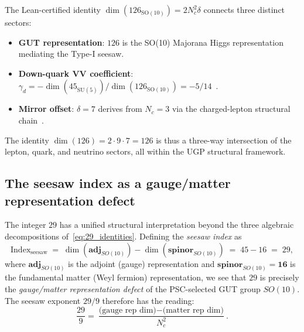 \documentclass[12pt,a4paper]{article}
\theoremstyle{definition}
\theoremstyle{remark}
\begin{document}
The Lean-certified identity $\dim(126_{\mathrm{SO}(10)}) = 2 N_c^2 \delta$
connects three distinct sectors:
\begin{itemize}[leftmargin=1.3em,itemsep=0.15em]
  \item \textbf{GUT representation}: $126$ is the SO(10)
    Majorana Higgs representation mediating the Type-I seesaw.
  \item \textbf{Down-quark VV coefficient}: $\gamma_d = -\dim(45_{\mathrm{SU}(5)})/\dim(126_{\mathrm{SO}(10)}) = -5/14$~\cite{Spivack2026_CyclotomicMass}.
  \item \textbf{Mirror offset}: $\delta = 7$ derives from $N_c = 3$
    via the charged-lepton structural chain~\cite{Spivack2026_Koide}.
\end{itemize}
The identity $\dim(126) = 2 \cdot 9 \cdot 7 = 126$
is thus a three-way intersection of the lepton, quark, and neutrino sectors,
all within the UGP structural framework.

\subsection{The seesaw index as a gauge/matter representation defect}
\label{subsec:seesaw_index}

The integer $29$ has a unified structural interpretation beyond the three algebraic decompositions of~\eqref{eq:29_identities}.  Defining the \emph{seesaw index} as
\[
  \mathrm{Index}_{\mathrm{seesaw}} \;=\; \dim(\mathbf{adj}_{SO(10)}) - \dim(\mathbf{spinor}_{SO(10)}) \;=\; 45 - 16 \;=\; 29,
\]
where $\mathbf{adj}_{SO(10)}$ is the adjoint (gauge) representation and $\mathbf{spinor}_{SO(10)} = \mathbf{16}$ is the fundamental matter (Weyl fermion) representation, we see that $29$ is precisely the \emph{gauge/matter representation defect} of the PSC-selected GUT group $SO(10)$.  The seesaw exponent $29/9$ therefore has the reading:
\[
  \frac{29}{9} = \frac{\text{(gauge rep dim)} - \text{(matter rep dim)}}{N_c^2}.
\]
\end{document}
